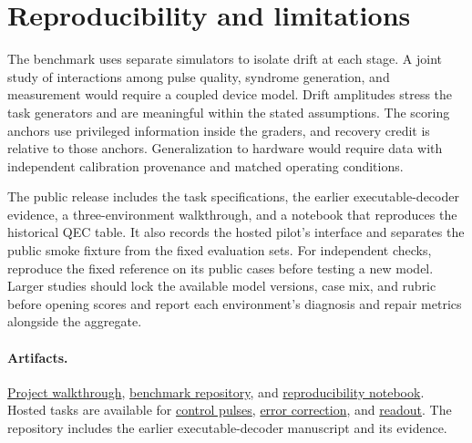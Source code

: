 \documentclass{article}
\begin{document}
\section{Reproducibility and limitations}
The benchmark uses separate simulators to isolate drift at each stage. A joint study of interactions among pulse quality, syndrome generation, and measurement would require a coupled device model. Drift amplitudes stress the task generators and are meaningful within the stated assumptions. The scoring anchors use privileged information inside the graders, and recovery credit is relative to those anchors. Generalization to hardware would require data with independent calibration provenance and matched operating conditions.

The public release includes the task specifications, the earlier executable-decoder evidence, a three-environment walkthrough, and a notebook that reproduces the historical QEC table. It also records the hosted pilot's interface and separates the public smoke fixture from the fixed evaluation sets. For independent checks, reproduce the fixed reference on its public cases before testing a new model. Larger studies should lock the available model versions, case mix, and rubric before opening scores and report each environment's diagnosis and repair metrics alongside the aggregate.

\paragraph{Artifacts.} \href{https://quantum-agent-bench.pages.dev/}{Project walkthrough}, \href{https://github.com/itsloganmann/quantum-agent-bench}{benchmark repository}, and \href{https://www.kaggle.com/code/loganmann24/quantum-agent-bench}{reproducibility notebook}. Hosted tasks are available for \href{https://www.kaggle.com/benchmarks/tasks/loganmann24/quantum-bench-control-pulses-pilot/2}{control pulses}, \href{https://www.kaggle.com/benchmarks/tasks/loganmann24/quantum-bench-error-correction-pilot/2}{error correction}, and \href{https://www.kaggle.com/benchmarks/tasks/loganmann24/quantum-bench-readout-pilot/2}{readout}. The repository includes the earlier executable-decoder manuscript and its evidence.

\label{sec:main-end}
\clearpage
\small
\balance


\end{document}
